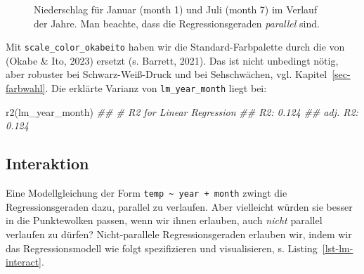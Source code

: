 \documentclass[
  letterpaper,
  twoside,
  open=any]{scrbook}
\newenvironment{Shaded}{\begin{snugshade}}{\end{snugshade}}
\newcommand{\DocumentationTok}[1]{\textcolor[rgb]{0.37,0.37,0.37}{\textit{#1}}}
\newcommand{\FunctionTok}[1]{\textcolor[rgb]{0.28,0.35,0.67}{#1}}
\newcommand{\NormalTok}[1]{\textcolor[rgb]{0.00,0.23,0.31}{#1}}
\theoremstyle{definition}
\theoremstyle{definition}
\theoremstyle{definition}
\theoremstyle{remark}
\begin{document}
\begin{figure}


\caption{\label{fig-lm3}Niederschlag für Januar (month 1) und Juli
(month 7) im Verlauf der Jahre. Man beachte, dass die Regressionsgeraden
\emph{parallel} sind.}

\end{figure}%

Mit \texttt{scale\_color\_okabeito} haben wir die Standard-Farbpalette
durch die von (Okabe \& Ito, 2023) ersetzt (s. Barrett, 2021). Das ist
nicht unbedingt nötig, aber robuster bei Schwarz-Weiß-Druck und bei
Sehschwächen, vgl. Kapitel~\ref{sec-farbwahl}. Die erklärte Varianz von
\texttt{lm\_year\_month} liegt bei:

\begin{Shaded}
\begin{Highlighting}[]
\FunctionTok{r2}\NormalTok{(lm\_year\_month)}
\DocumentationTok{\#\# \# R2 for Linear Regression}
\DocumentationTok{\#\#        R2: 0.124}
\DocumentationTok{\#\#   adj. R2: 0.124}
\end{Highlighting}
\end{Shaded}

\subsection{Interaktion}\label{interaktion}

Eine Modellgleichung der Form
\texttt{temp\ \textasciitilde{}\ year\ +\ month} zwingt die
Regressionsgeraden dazu, parallel zu verlaufen. Aber vielleicht würden
sie besser in die Punktewolken passen, wenn wir ihnen erlauben, auch
\emph{nicht} parallel verlaufen zu dürfen? Nicht-parallele
Regressionsgeraden erlauben wir, indem wir das Regressionsmodell wie
folgt spezifizieren und visualisieren, s. Listing~\ref{lst-lm-interact}.
\end{document}

